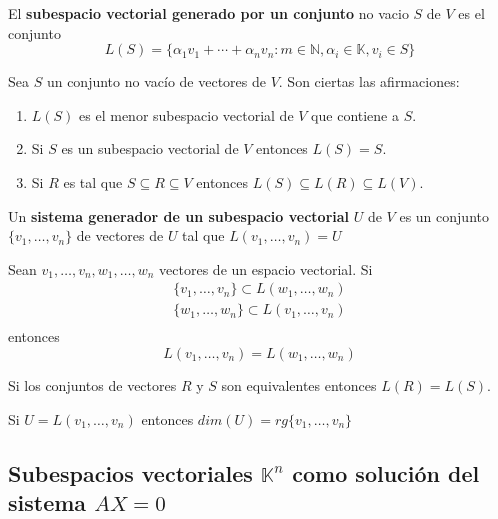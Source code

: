 \begin{defi}
	El \textbf{subespacio vectorial generado por un conjunto} no vacio $S$ de $V$ es el conjunto
	\[
	L(S) = \lbrace \alpha_1 v_1 + \cdots + \alpha_n v_n: m \in \mathbb{N}, \alpha_i \in \mathbb{K}, v_i \in S\rbrace
	\]
\end{defi}

\begin{prop}
	Sea $S$ un conjunto no vacío de vectores de $V$. Son ciertas las afirmaciones:
	\begin{enumerate}
		\item $L(S)$ es el menor subespacio vectorial de $V$ que contiene a $S$.
		\item Si $S$ es un subespacio vectorial de $V$ entonces $L(S)=S$.
		\item Si $R$ es tal que $S \subseteq R \subseteq V$ entonces $L(S) \subseteq L(R) \subseteq L(V)$.
	\end{enumerate}
\end{prop}

\begin{defi}
	Un \textbf{sistema generador de un subespacio vectorial} $U$ de $V$ es un conjunto $\lbrace v_1,\ldots,v_n \rbrace$ de vectores de $U$ tal que $L(v_1,\ldots,v_n)=U$
\end{defi}

\begin{prop}
	Sean $v_1,\ldots,v_n,w_1,\ldots,w_n$ vectores de un espacio vectorial. Si
	\begin{align*}
	\lbrace v_1,\ldots,v_n\rbrace \subset L(w_1,\ldots,w_n) \\
	\lbrace w_1,\ldots,w_n\rbrace \subset L(v_1,\ldots,v_n) \\
	\end{align*}
	entonces
	\[
	L(v_1,\ldots,v_n)=L(w_1,\ldots,w_n)
	\]
\end{prop}

\begin{theorem}
	Si los conjuntos de vectores $R$ y $S$ son equivalentes entonces $L(R)=L(S)$.
\end{theorem}

\begin{theorem}
	Si $U=L(v_1,\ldots,v_n)$ entonces $dim(U)=rg \lbrace v_1,\ldots,v_n \rbrace$
\end{theorem}

\subsection{Subespacios vectoriales $\mathbb{K}^n$ como solución del sistema $AX=0$}

